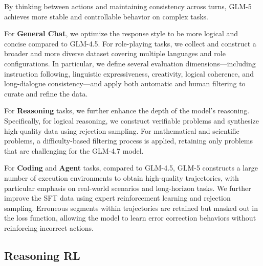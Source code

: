 \documentclass{article}
\theoremstyle{definition}
\begin{document}
By thinking between actions and maintaining consistency across turns, GLM-5 achieves more stable and controllable behavior on complex tasks.

For \textbf{General Chat}, we optimize the response style to be more logical and concise compared to GLM-4.5. For role-playing tasks, we collect and construct a broader and more diverse dataset covering multiple languages and role configurations. In particular, we define several evaluation dimensions---including instruction following, linguistic expressiveness, creativity, logical coherence, and long-dialogue consistency---and apply both automatic and human filtering to curate and refine the data.

For \textbf{Reasoning} tasks, we further enhance the depth of the model's reasoning. Specifically, for logical reasoning, we construct verifiable problems and synthesize high-quality data using rejection sampling. For mathematical and scientific problems, a difficulty-based filtering process is applied, retaining only problems that are challenging for the GLM-4.7 model.

For \textbf{Coding} and \textbf{Agent} tasks, compared to GLM-4.5, GLM-5 constructs a large number of execution environments to obtain high-quality trajectories, with particular emphasis on real-world scenarios and long-horizon tasks. We further improve the SFT data using expert reinforcement learning and rejection sampling. Erroneous segments within trajectories are retained but masked out in the loss function, allowing the model to learn error correction behaviors without reinforcing incorrect actions.

\subsection{Reasoning RL}
\end{document}

